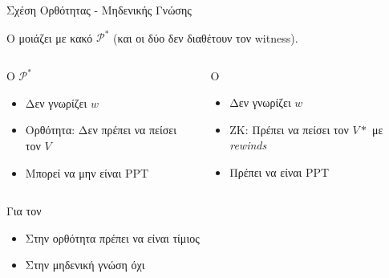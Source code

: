 \documentclass[handout]{beamer}
\begin{document}
\begin{frame}{Σχέση Oρθότητας - Μηδενικής Γνώσης}

O \siml μοιάζει με κακό $\mathcal{P}^*$ (και οι δύο δεν διαθέτουν τον witness). \\
\medskip

\begin{columns}

\begin{block}{Ο $\mathcal{P}^*$}
	\begin{itemize}
		\item Δεν γνωρίζει $w$
		\item Ορθότητα: Δεν πρέπει να πείσει τον $V$
		\item Μπορεί να μην είναι PPT
	\end{itemize}
\end{block}
 
\begin{block}{Ο \siml}
\begin{itemize}
	\item Δεν γνωρίζει $w$
	\item ΖΚ: Πρέπει να πείσει τον $V*$ με \emph{rewinds}
	\item Πρέπει να είναι PPT
\end{itemize}
\end{block}
\end{columns}

\medskip
\begin{block}{Για τον \ver}
\begin{itemize}
\item Στην ορθότητα πρέπει να είναι τίμιος
\item Στην μηδενική γνώση όχι
\end{itemize}
\end{block}

\end{frame}
\end{document}
